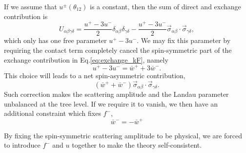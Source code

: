 \documentclass[reprint,amsmath,amssymb,aps,prb]{revtex4-1}
\begin{document}
\begin{enumerate}
          If we assume that $u^{\pm}(\theta_{12})$ is a constant, then the sum of direct and exchange contribution is
          \begin{equation}
              U_{\alpha\beta\gamma\delta}=\frac{u^+-3u^-}{2}\delta_{\alpha\beta}\delta_{\gamma\delta}-\frac{u^+-3u^-}{2}\vec{\sigma}_{\alpha\beta}\cdot \vec{\sigma}_{\gamma\delta},
          \end{equation}
          which only has one free parameter $u^+-3u^-$. We may fix this parameter by requiring the contact term completely cancel the spin-symmetric part of the exchange contribution in Eq.\eqref{eq:exchange_kF}, namely
          \begin{equation}
              u^+-3u^-=\bar{w}^+ +3\bar{w}^-.
          \end{equation}
          This choice will leads to a net spin-asymmetric contribution,
          \begin{equation}
              (\bar{w}^++\bar{w}^-)\vec{\sigma}_{\alpha\beta}\cdot \vec{\sigma}_{\gamma\delta}.
          \end{equation}
          Such correction makes the scattering amplitude and the Landau parameter unbalanced at the tree level. If we require it to vanish, we then have an additional constraint which fixes $f^-$,
          \begin{equation}
              \bar{w}^{-} = -\bar{w}^{+}
          \end{equation}

          By fixing the spin-symmetric scattering amplitude to be physical, we are forced to introduce $f^-$ and $u$ together to make the theory self-consistent.

\end{enumerate}



\end{document}
